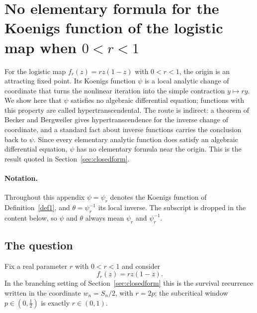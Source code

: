 \begingroup
\omitfromtoc
\renewcommand{\theHsection}{\thechapter.appendix.\Alph{section}}
\renewcommand{\theHsubsection}{\theHsection.\arabic{subsection}}
\renewcommand{\theHsubsubsection}{\theHsubsection.\arabic{subsubsection}}
\renewcommand{\thesection}{\thechapter.\Alph{section}}
\setcounter{section}{0}



\section[No elementary formula for the Koenigs function of the logistic map when\texorpdfstring{\protect\\}{ }$0<r<1$]{No elementary formula for the Koenigs function of the logistic map when \texorpdfstring{$0<r<1$}{0 < r < 1}}
\label{app:hyper}

For the logistic map $f_r(z)=rz(1-z)$ with $0<r<1$, the origin is an attracting fixed point. Its Koenigs function $\psi$ is a local analytic change of coordinate that turns the nonlinear iteration into the simple contraction $y\mapsto ry$. We show here that $\psi$ satisfies no algebraic differential equation; functions with this property are called hypertranscendental. The route is indirect: a theorem of Becker and Bergweiler gives hypertranscendence for the inverse change of coordinate, and a standard fact about inverse functions carries the conclusion back to $\psi$. Since every elementary analytic function does satisfy an algebraic differential equation, $\psi$ has no elementary formula near the origin. This is the result quoted in Section~\ref{sec:closedform}.

\paragraph{Notation.} Throughout this appendix $\psi=\psi_r$ denotes the Koenigs function of Definition~\ref{def1}, and $\theta=\psi_r^{-1}$ its local inverse. The subscript is dropped in the content below, so $\psi$ and $\theta$ always mean $\psi_r$ and $\psi_r^{-1}$.

\subsection{The question}

Fix a real parameter $r$ with $0<r<1$ and consider
\begin{equation}
 f_r(z)=rz(1-z).
\end{equation}
In the branching setting of Section~\ref{sec:closedform} this is the survival recurrence written in the coordinate $w_n=S_n/2$, with $r=2p$; the subcritical window $p\in(0,\tfrac12)$ is exactly $r\in(0,1)$.

